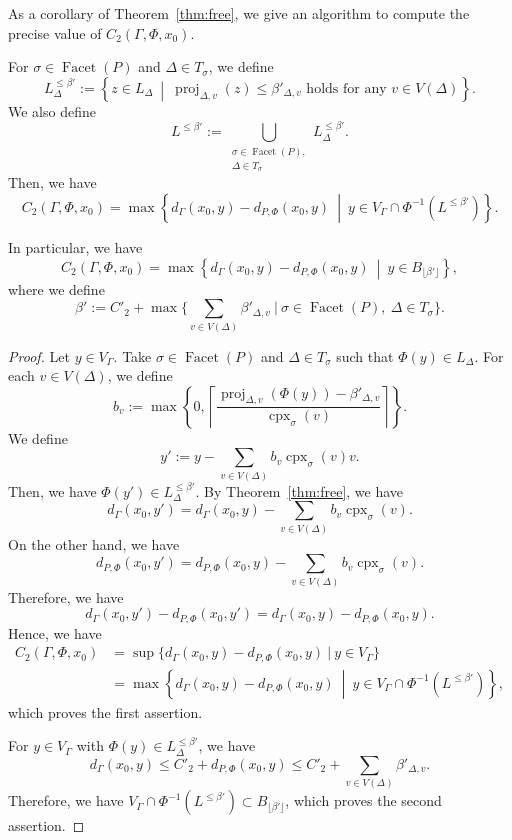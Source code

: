 As a corollary of Theorem~\ref{thm:free}, we give an algorithm to compute the precise value of $C_{2}(\Gamma, \Phi, x_0)$. 

\begin{thm}\label{thm:C2}
For $\sigma \in \operatorname{Facet}(P)$ and $\Delta \in T_{\sigma}$, 
we define 
\[
L_{\Delta} ^{\le \beta'} 
:= \left \{ z \in L_{\Delta} \ \middle | \ \text{$\operatorname{proj}_{\Delta, v}(z) \le \beta' _{\Delta, v}$ holds for any $v \in V(\Delta)$} \right \}. 
\]
We also define 
\[
L ^{\le \beta'} := 
\bigcup _{\substack{\sigma \in \operatorname{Facet}(P),\\ \Delta \in T_{\sigma}}}
L_{\Delta} ^{\le \beta'}.  
\]
Then, we have 
\[
C_{2}(\Gamma, \Phi, x_0) = 
\max \left \{ d_{\Gamma}(x_0, y) - d_{P, \Phi}(x_0, y) \ \middle | \ 
y \in V_{\Gamma} \cap \Phi ^{-1} \left( L ^{\le \beta'} \right) \right \}. 
\]

In particular, we have 
\[
C_{2}(\Gamma, \Phi, x_0) = \max \left \{ d_{\Gamma}(x_0, y) - d_{P, \Phi}(x_0, y) \ \middle | \ 
y \in B_{\lfloor \beta ' \rfloor} \right \}, 
\]
where we define 
\[
\beta ' := C'_2 + \max 
\Biggl \{ \sum _{v \in V(\Delta)} \beta' _{\Delta, v} \ \Bigg| \ \sigma \in \operatorname{Facet}(P), \ \Delta \in T_{\sigma} \Biggr \}. 
\]
\end{thm}
\begin{proof}
Let $y \in V_{\Gamma}$. 
Take $\sigma \in \operatorname{Facet}(P)$ and $\Delta \in T_{\sigma}$ such that $\Phi(y) \in L_{\Delta}$.
For each $v \in V(\Delta)$, we define 
\[
b_v := \max 
\left\{ 0, 
\left \lceil  \frac{\operatorname{proj}_{\Delta, v}(\Phi(y)) - \beta' _{\Delta, v}}{\operatorname{cpx}_{\sigma}(v)} 
\right \rceil \right\}. 
\]
We define
\[
y' := y - \sum _{v \in V(\Delta)} b_v \operatorname{cpx}_{\sigma}(v) v. 
\]
Then, we have $\Phi(y') \in L _{\Delta} ^{\le \beta'}$. By Theorem~\ref{thm:free}, we have 
\[
d_{\Gamma}(x_0, y') = d_{\Gamma}(x_0, y) - \sum _{v \in V(\Delta)} b_v \operatorname{cpx}_{\sigma}(v). 
\]
On the other hand, we have 
\[
d_{P, \Phi}(x_0, y') = d_{P, \Phi}(x_0, y) - \sum _{v \in V(\Delta)} b_v \operatorname{cpx}_{\sigma}(v). 
\]
Therefore, we have 
\[
d_{\Gamma}(x_0, y') - d_{P, \Phi}(x_0, y') = d_{\Gamma}(x_0, y) - d_{P, \Phi}(x_0, y). 
\]
Hence, we have 
\begin{align*}
C_{2}(\Gamma, \Phi, x_0) 
&= \sup \bigl \{ d_{\Gamma}(x_0, y) - d_{P, \Phi}(x_0, y) \ \big | \ y \in V_{\Gamma} \bigr\} \\
&= \max \left \{ d_{\Gamma}(x_0, y) - d_{P, \Phi}(x_0, y) \ \middle | \ 
y \in V_{\Gamma} \cap \Phi ^{-1} \left( L ^{\le \beta'} \right) \right \}, 
\end{align*}
which proves the first assertion. 

For $y \in V_{\Gamma}$ with $\Phi(y) \in L_{\Delta} ^{\le \beta'}$, we have 
\[
d_{\Gamma}(x_0, y) \le C'_2 + d_{P, \Phi}(x_0, y) \le C'_2 +  \sum _{v \in V(\Delta)} \beta' _{\Delta, v}. 
\]
Therefore, we have $V_{\Gamma} \cap \Phi ^{-1} \left( L ^{\le \beta'} \right) \subset B_{\lfloor \beta ' \rfloor}$, 
which proves the second assertion. 
\end{proof}


